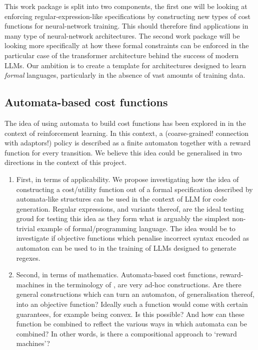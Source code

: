 \documentclass[11pt,a4paper]{article}
\begin{document}
	This work package is split into two components, the first one will be looking at enforcing regular-expression-like specifications by constructing new types of cost functions for neural-network training. This should therefore find applications in many type of neural-network architectures. The second work package will be looking more specifically at how these formal constraints can be enforced in the particular case of the transformer architecture behind the success of modern LLMs. Our ambition is to create a template for architectures designed to learn \emph{formal} languages, particularly in the absence of vast amounts of training data.
	
	\setcounter{section}{2}
	\setcounter{subsection}{0}
		\subsection{Automata-based cost functions}
			The idea of using automata to build cost functions has been explored in \cite{icarte2022reward} in the context of reinforcement learning. In this context, a (coarse-grained! connection with adaptors!) policy is described as a finite automaton together with a reward function for every transition.  
			We believe this idea could be generalised in two directions in the context of this project.
			\begin{enumerate}
				\item First, in terms of applicability. We propose investigating how the idea of constructing a cost/utility function out of a formal specification described by automata-like structures can be used in the context of LLM for code generation. Regular expressions, and variants thereof, are the ideal testing groud for testing this idea as they form what is arguably the simplest non-trivial example of formal/programming language. The idea would be to investigate if objective functions which penalise incorrect syntax encoded as automaton can be used to in the training of LLMs designed to generate regexes.
				\item Second, in terms of mathematics. Automata-based cost functions, reward-machines in the terminology of \cite{icarte2022reward}, are very ad-hoc constructions. Are there general constructions which can turn an automaton, of generalisation thereof, into an objective function? Ideally such a function would come with certain guarantees, for example being convex. Is this possible? And how can these function be combined to reflect the various ways in which automata can be combined? In other words, is there a compositional approach to `reward machines'?
			\end{enumerate} 
		
\end{document}
